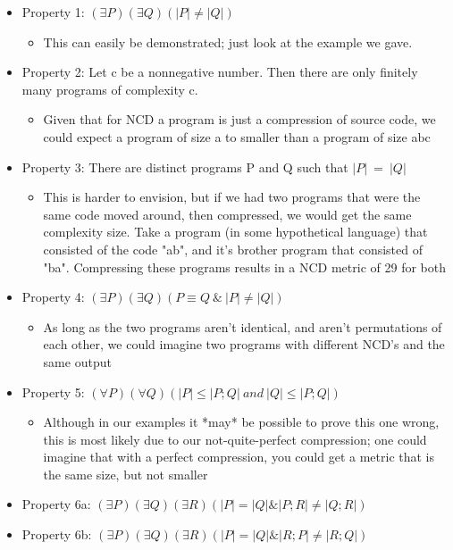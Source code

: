 \documentclass[]{article}
\begin{document}
\begin{itemize}
	\item Property 1: $(\exists P)(\exists Q)(|P|\neq |Q|)$
	\begin{itemize}
		\item This can easily be demonstrated; just look at the example we gave.
	\end{itemize}
	\item Property 2: Let c be a nonnegative number. Then there
are only finitely many programs of complexity c.
	\begin{itemize}
		\item Given that for NCD a program is just a compression of source code, we could expect a program of size a to smaller than a program of size abc 
	\end{itemize}
	\item Property 3: There are distinct programs P and Q such
that $|P| ~= ~|Q|$
	\begin{itemize}
		\item This is harder to envision, but if we had two programs that were the same code moved around, then compressed, we would get the same complexity size. Take a program (in some hypothetical language) that consisted of the code "ab", and it's brother program that consisted of "ba". Compressing these programs results in a NCD metric of 29 for both
	\end{itemize}
	\item Property 4: $(\exists P)(\exists Q)(P \equiv Q ~\& ~|P| \neq |Q|)$
	\begin{itemize}
		\item As long as the two programs aren't identical, and aren't permutations of each other, we could imagine two programs with different NCD's and the same output
	\end{itemize}
	\item Property 5: $(\forall P)(\forall Q)(|P| \leq |P; Q| ~and ~|Q| \leq |P; Q|)$
	\begin{itemize}
		\item Although in our examples it *may* be possible to prove this one wrong, this is most likely due to our not-quite-perfect compression; one could imagine that with a perfect compression, you could get a metric that is the same size, but not smaller
	\end{itemize}
	\item Property 6a: $(\exists P)(\exists Q)(\exists R)(|P| = |Q| \& |P;R| \neq |Q; R|)$
	\item Property 6b: $(\exists P)(\exists Q)(\exists R)(|P| = |Q| \& |R;P| \neq |R; Q|)$

\end{itemize}
\end{document}
